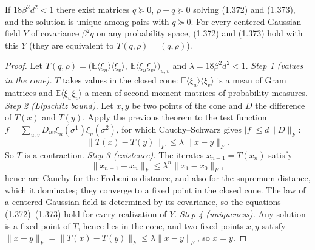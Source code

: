 \begin{theorem}\label{thm:sg-tal:vector-fixed-point-exists}
\leanok
{}
If $18\beta^2d^2<1$ there exist matrices $q\succeq0$, $\rho-q\succeq0$ solving (1.372) and (1.373), and the solution is unique among pairs with $q\succeq0$. For every centered Gaussian field $Y$ of covariance $\beta^2q$ on any probability space, (1.372) and (1.373) hold with this $Y$ (they are equivalent to $T(q,\rho)=(q,\rho)$).
\end{theorem}
\begin{proof}
\leanok
Let $T(q,\rho)=\big(\mathbb E\langle\xi_u\rangle\langle\xi_v\rangle,\ \mathbb E\langle\xi_u\xi_v\rangle\big)_{u,v}$ and $\lambda=18\beta^2d^2<1$.
\emph{Step 1 (values in the cone).} $T$ takes values in the closed cone: $\mathbb E\langle\xi_u\rangle\langle\xi_v\rangle$ is a mean of Gram matrices and $\mathbb E\langle\xi_u\xi_v\rangle$ a mean of second-moment matrices of probability measures.
\emph{Step 2 (Lipschitz bound).} Let $x,y$ be two points of the cone and $D$ the difference of $T(x)$ and $T(y)$. Apply the previous theorem to the test function $f=\sum_{u,v}D_{uv}\xi_u(\sigma^1)\xi_v(\sigma^2)$, for which Cauchy--Schwarz gives $|f|\le d\|D\|_F$:
\[
\|T(x)-T(y)\|_F\le\lambda\,\|x-y\|_F .
\]
So $T$ is a contraction.
\emph{Step 3 (existence).} The iterates $x_{n+1}=T(x_n)$ satisfy
\[
\|x_{n+1}-x_n\|_F\le\lambda^n\|x_1-x_0\|_F ,
\]
hence are Cauchy for the Frobenius distance, and also for the supremum distance, which it dominates; they converge to a fixed point in the closed cone. The law of a centered Gaussian field is determined by its covariance, so the equations (1.372)--(1.373) hold for every realization of $Y$.
\emph{Step 4 (uniqueness).} Any solution is a fixed point of $T$, hence lies in the cone, and two fixed points $x,y$ satisfy $\|x-y\|_F=\|T(x)-T(y)\|_F\le\lambda\|x-y\|_F$, so $x=y$.
\end{proof}

